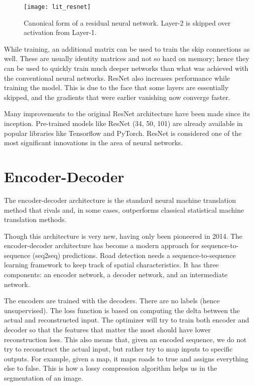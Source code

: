 \begin{figure}[h!]
    \centering
    \texttt{[image: lit\_resnet]}
    \caption[A residual network]{Canonical form of a residual neural network. Layer-2 is skipped over activation from Layer-1.}
    \label{fig:residual_network}
\end{figure}

While training, an additional matrix can be used to train the skip connections as well. These are usually identity matrices and not so hard on memory; hence they can be used to quickly train much deeper networks than what was achieved with the conventional neural networks. ResNet also increases performance while training the model. This is due to the face that some layers are essentially skipped, and the gradients that were earlier vanishing now converge faster.

Many improvements to the original ResNet architecture have been made since its inception. Pre-trained models like ResNet (34, 50, 101) are already available in popular libraries like Tensorflow and PyTorch. ResNet is considered one of the most significant innovations in the area of neural networks.

\section{Encoder-Decoder}
The encoder-decoder architecture is the standard neural machine translation method that rivals and, in some cases, outperforms classical statistical machine translation methods.

Though this architecture is very new, having only been pioneered in 2014. The encoder-decoder architecture has become a modern approach for sequence-to-sequence (seq2seq) predictions. Road detection needs a sequence-to-sequence learning framework to keep track of spatial characteristics. It has three components: an encoder network, a decoder network, and an intermediate network.

The encoders are trained with the decoders. There are no labels (hence unsupervised). The loss function is based on computing the delta between the actual and reconstructed input. The optimizer will try to train both encoder and decoder so that the features that matter the most should have lower reconstruction loss. This also means that, given an encoded sequence, we do not try to reconstruct the actual input, but rather try to map inputs to specific outputs. For example, given a map, it maps roads to true and assigns everything else to false. This is how a lossy compression algorithm helps us in the segmentation of an image.
